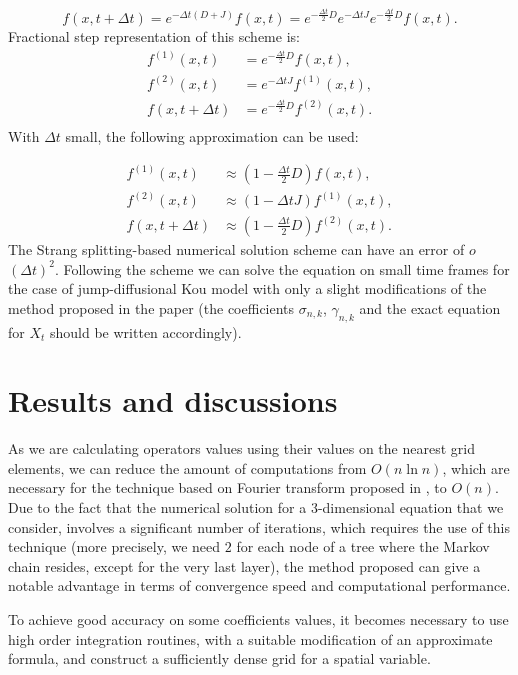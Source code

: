 \documentclass[a4paper]{jpconf}
\begin{document}
{\begin{equation}
f(x, t+\Delta t) = e^{-\Delta t(D+J)}f(x, t) = e^{-\frac{\Delta t}{2} D} e^{- \Delta t J} e^{-\frac{\Delta t}{2} D} f(x, t).
\end{equation}
Fractional step representation of this scheme is:
\begin{align*}
f^{(1)}(x, t) &= e^{-\frac{\Delta t}{2} D} f(x, t), \\
f^{(2)}(x, t) &= e^{-\Delta t J} f^{(1)}(x, t), \\
f(x, t + \Delta t) &= e^{-\frac{\Delta t}{2} D} f^{(2)}(x, t). \\
\end{align*}
With $\Delta t$ small, the following approximation can be used:

\begin{align*}
f^{(1)}(x, t) &\approx (1-\frac{\Delta t}{2} D) f(x, t), \\
f^{(2)}(x, t) &\approx (1-\Delta t J) f^{(1)}(x, t), \\
f(x, t + \Delta t) &\approx (1-\frac{\Delta t}{2} D) f^{(2)}(x, t).
\end{align*}
The Strang splitting-based numerical solution scheme can have an error of $o$$(\Delta t)^2$. Following the scheme we can solve the equation on small time frames for the case of jump-diffusional Kou model with only a slight modifications of the method proposed in the paper (the coefficients $\sigma_{n, k}$, $\gamma_{n,k}$ and the exact equation for $X_t$ should be written accordingly).

\section{Results and discussions}

As we are calculating operators values using their values on the nearest grid elements, we can reduce the amount of computations from  $O(n\ln{n})$, which are necessary for the technique based on Fourier transform proposed in \cite{kudr_jopcs}, to $O(n)$. Due to the fact that the numerical solution for a 3-dimensional equation that we consider, involves a significant number of iterations, which requires the use of this technique (more precisely, we need $2$ for each node of a tree where the Markov chain resides, except for the very last layer), the method proposed can give a notable advantage in terms of convergence speed and computational performance.

To achieve good accuracy on some coefficients values, it becomes necessary to use high order integration routines, with a suitable modification of an approximate formula, and construct a sufficiently dense grid for a spatial variable.

}
\end{document}
